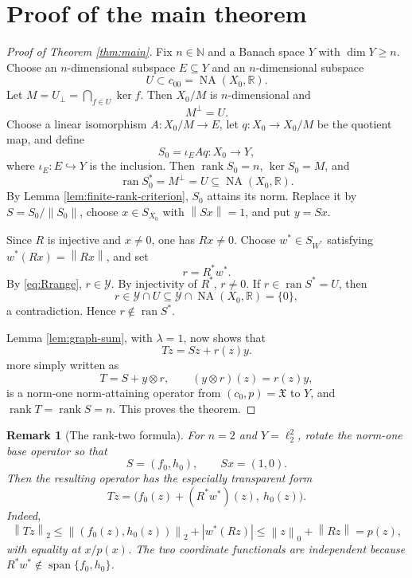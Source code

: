 \documentclass[11pt]{article}
\newtheorem{remark}[theorem]{Remark}
\theoremstyle{definition}
\newcommand{\NA}{\operatorname{NA}}
\newcommand{\ran}{\operatorname{ran}}
\newcommand{\rank}{\operatorname{rank}}
\newcommand{\R}{\mathbb R}
\newcommand{\X}{\mathfrak X}
\newcommand{\Xzero}{X_0}
\newcommand{\Yop}{\mathscr Y}
\newcommand{\norm}[1]{\left\lVert #1\right\rVert}
\newcommand{\abs}[1]{\left\lvert #1\right\rvert}
\begin{document}
\section{Proof of the main theorem}

\begin{proof}[Proof of Theorem \ref{thm:main}]
Fix \(n\in\mathbb N\) and a Banach space \(Y\) with \(\dim Y\geq n\).
Choose an \(n\)-dimensional subspace \(E\subseteq Y\) and an
\(n\)-dimensional subspace
\[
                  U\subset c_{00}=\NA(\Xzero,\R).
\]
Let \(M=U_\perp=\bigcap_{f\in U}\ker f\).  Then \(\Xzero/M\) is
\(n\)-dimensional and
\[
                  M^\perp=U.
\]
Choose a linear isomorphism \(A:\Xzero/M\to E\), let
\(q:\Xzero\to\Xzero/M\) be the quotient map, and define
\[
                  S_0=\iota_E A q:\Xzero\longrightarrow Y,
\]
where \(\iota_E:E\hookrightarrow Y\) is the inclusion.  Then
\(\rank S_0=n\), \(\ker S_0=M\), and
\[
          \ran S_0^*=M^\perp=U\subseteq\NA(\Xzero,\R).
\]
By Lemma \ref{lem:finite-rank-criterion}, \(S_0\) attains its norm.  Replace
it by \(S=S_0/\norm{S_0}\), choose
\(x\in S_{\Xzero}\) with \(\norm{Sx}=1\), and put \(y=Sx\).

Since \(R\) is injective and \(x\neq0\), one has \(Rx\neq0\).  Choose
\(w^*\in S_{W^*}\) satisfying \(w^*(Rx)=\norm{Rx}\), and set
\[
                    r=R^*w^*.
\]
By \eqref{eq:Rrange}, \(r\in\Yop\).  By injectivity of \(R^*\),
\(r\neq0\).  If \(r\in\ran S^*=U\), then
\[
     r\in \Yop\cap U
       \subseteq \Yop\cap\NA(\Xzero,\R)
       =\{0\},
\]
a contradiction.  Hence \(r\notin\ran S^*\).

Lemma \ref{lem:graph-sum}, with \(\lambda=1\), now shows that
\[
          Tz=Sz+r(z)y.
\]
more simply written as
\[
          T=S+y\otimes r,
          \qquad (y\otimes r)(z)=r(z)y,
\]
is a norm-one norm-attaining operator from \((c_0,p)=\X\) to \(Y\), and
\(\rank T=\rank S=n\).  This proves the theorem.
\end{proof}

\begin{remark}[The rank-two formula]\label{rem:rank-two-formula}
For \(n=2\) and \(Y=\ell_2^2\), rotate the norm-one base operator so that
\[
                S=(f_0,h_0),\qquad Sx=(1,0).
\]
Then the resulting operator has the especially transparent form
\[
        Tz=\bigl(f_0(z)+(R^*w^*)(z),\ h_0(z)\bigr).
\]
Indeed,
\[
 \norm{Tz}_2
 \leq \norm{(f_0(z),h_0(z))}_2+\abs{w^*(Rz)}
 \leq \norm{z}_0+\norm{Rz}=p(z),
\]
with equality at \(x/p(x)\).  The two coordinate functionals are independent
because \(R^*w^*\notin\operatorname{span}\{f_0,h_0\}\).
\end{remark}
\end{document}
